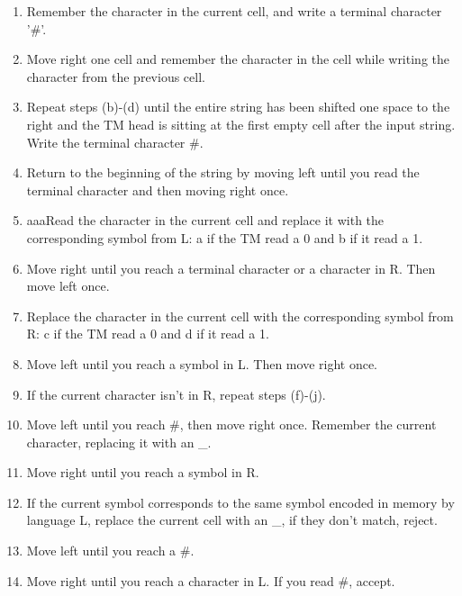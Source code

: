 \begin{enumerate}
\begin{enumerate}
        \item Remember the character in the current cell, and write a terminal character '\#'.

        \item Move right one cell and remember the character in the cell while writing the character from the previous cell.

        \item Repeat steps (b)-(d) until the entire string has been shifted one space to the right and the TM head is sitting at the first empty cell after the input string. Write the terminal character \#.

        \item Return to the beginning of the string by moving left until you read the terminal character and then moving right once.

        \item aaaRead the character in the current cell and replace it with the corresponding symbol from L: a if the TM read a 0 and b if it read a 1.

        \item Move right until you reach a terminal character or a character in R. Then move left once.

        \item Replace the character in the current cell with the corresponding symbol from R: c if the TM read a 0 and d if it read a 1.

        \item Move left until you reach a symbol in L. Then move right once.

        \item If the current character isn't in R, repeat steps (f)-(j).

        \item Move left until you reach \#, then move right once. Remember the current character, replacing it with an \_.

        \item Move right until you reach a symbol in R.

        \item If the current symbol corresponds to the same symbol encoded in memory by language L,  replace the current cell with an \_, if they don't match, reject.

        \item Move left until you reach a \#.

        \item Move right until you reach a character in L. If you read \#, accept.


\end{enumerate}
\end{enumerate}
